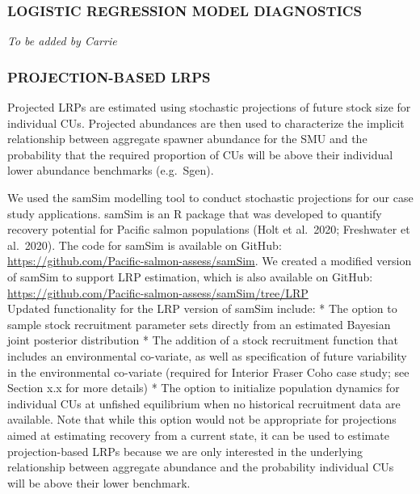 \documentclass[11pt]{book}
\begin{document}
\hypertarget{logistic-regression-model-diagnostics}{%
\subsubsection{LOGISTIC REGRESSION MODEL DIAGNOSTICS}\label{logistic-regression-model-diagnostics}}

\emph{To be added by Carrie}

\hypertarget{projection-based-lrps}{%
\subsubsection{PROJECTION-BASED LRPS}\label{projection-based-lrps}}

Projected LRPs are estimated using stochastic projections of future stock size for individual CUs. Projected abundances are then used to characterize the implicit relationship between aggregate spawner abundance for the SMU and the probability that the required proportion of CUs will be above their individual lower abundance benchmarks (e.g.~Sgen).

We used the samSim modelling tool to conduct stochastic projections for our case study applications. samSim is an R package that was developed to quantify recovery potential for Pacific salmon populations (Holt et al.~2020; Freshwater et al.~2020). The code for samSim is available on GitHub: \url{https://github.com/Pacific-salmon-assess/samSim}. We created a modified version of samSim to support LRP estimation, which is also available on GitHub: \url{https://github.com/Pacific-salmon-assess/samSim/tree/LRP}\\
Updated functionality for the LRP version of samSim include: * The option to sample stock recruitment parameter sets directly from an estimated Bayesian joint posterior distribution * The addition of a stock recruitment function that includes an environmental co-variate, as well as specification of future variability in the environmental co-variate (required for Interior Fraser Coho case study; see Section x.x for more details) * The option to initialize population dynamics for individual CUs at unfished equilibrium when no historical recruitment data are available. Note that while this option would not be appropriate for projections aimed at estimating recovery from a current state, it can be used to estimate projection-based LRPs because we are only interested in the underlying relationship between aggregate abundance and the probability individual CUs will be above their lower benchmark.
\end{document}
